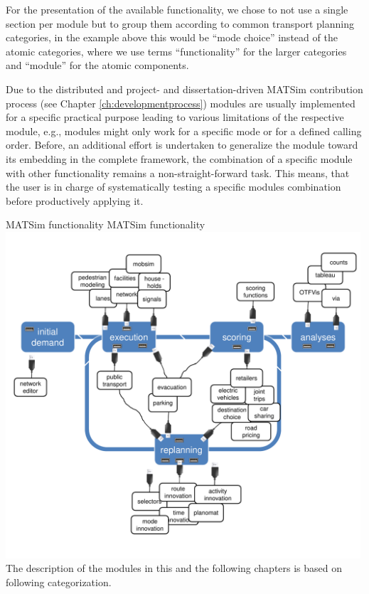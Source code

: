For the presentation of the available functionality, we chose to not use a single section per module but to group them according to common transport planning categories, in the example above this would be ``mode choice'' instead of the atomic categories, where we use terms ``functionality'' for the larger categories and ``module'' for the atomic components. 

Due to the distributed and project- and dissertation-driven MATSim contribution process (see Chapter \ref{ch:developmentprocess}) modules are usually implemented for a specific practical purpose leading to various limitations of the respective module, e.g., modules might only work for a specific mode or for a defined calling order. Before, an additional effort is undertaken to generalize the module toward its embedding in the complete framework, the combination of a specific module with other functionality remains a non-straight-forward task. This means, that the user is in charge of systematically testing a specific modules combination before productively applying it.

\createfigure%
{MATSim functionality}%
{MATSim functionality}%
{\label{fig:matsimmodules}}%
{\includegraphics[width=0.99\textwidth, angle=0]{extending/figures/modules.pdf}}%
{}
%
The description of the modules in this and the following chapters is based on following categorization.

